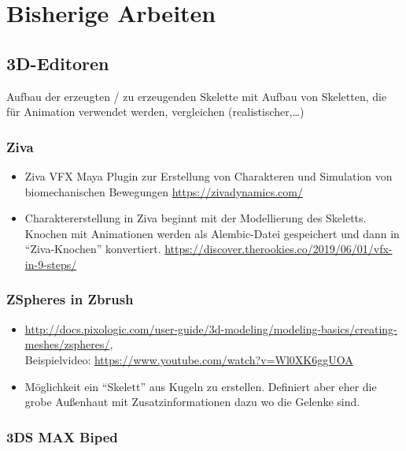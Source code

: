 \chapter{Bisherige Arbeiten}


\section{3D-Editoren}

Aufbau der erzeugten / zu erzeugenden Skelette mit Aufbau von Skeletten, die für Animation verwendet werden, vergleichen (realistischer,\dots)

\subsection{Ziva}

\begin{itemize}
 \item Ziva VFX Maya Plugin zur Erstellung von Charakteren und Simulation von biomechanischen Bewegungen \url{https://zivadynamics.com/}
 \item Charaktererstellung in Ziva beginnt mit der Modellierung des Skeletts. Knochen mit Animationen werden als Alembic-Datei gespeichert und dann in "`Ziva-Knochen"' konvertiert. \url{https://discover.therookies.co/2019/06/01/vfx-in-9-steps/}
\end{itemize}

\subsection{ZSpheres in Zbrush}

\begin{itemize}
 \item \url{http://docs.pixologic.com/user-guide/3d-modeling/modeling-basics/creating-meshes/zspheres/},\\ Beispielvideo: \url{https://www.youtube.com/watch?v=Wl0XK6ggUOA}
 \item Möglichkeit ein "`Skelett"' aus Kugeln zu erstellen. Definiert aber eher die grobe Außenhaut mit Zusatzinformationen dazu wo die Gelenke sind.
\end{itemize}

\subsection{3DS MAX Biped}


